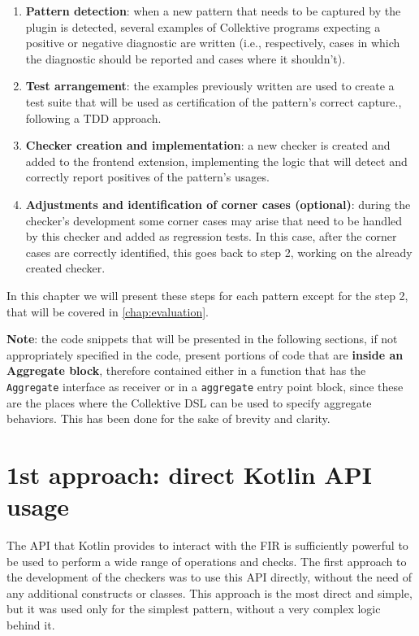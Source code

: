 \documentclass[12pt,a4paper,openright,twoside]{book}
\begin{document}
\begin{enumerate}
  \item \textbf{Pattern detection}: when a new pattern that needs to be captured
  by the plugin is detected, several examples of Collektive programs expecting a
  positive or negative  diagnostic are written (i.e., respectively, cases in
  which the diagnostic should be reported and cases where it shouldn't).
  \item \textbf{Test arrangement}: the examples previously written are used to 
  create a test suite that will be used as certification of the pattern's correct
  capture., following a \ac{TDD} approach.
  \item \textbf{Checker creation and implementation}: a new checker is created and
  added to the frontend extension, implementing the logic that will detect and 
  correctly report positives of the pattern's usages.
  \item \textbf{Adjustments and identification of corner cases (optional)}: during
  the checker's development some corner cases may arise that need to be handled 
  by this checker and added as regression tests. In this case, after the corner 
  cases are correctly identified, this goes back to step 2, working on the already
  created checker.
\end{enumerate}

In this chapter we will present these steps for each pattern except for the step
2, that will be covered in \cref{chap:evaluation}. 

\textbf{Note}: the code snippets that will be presented in the following
sections, if not appropriately specified in the code, present portions of code
that are \textbf{inside an Aggregate block}, therefore contained either in a
function that has the \lstinline{Aggregate} interface as receiver or in a 
\lstinline{aggregate} entry point block, since these are the places where 
the Collektive DSL can be used to specify aggregate behaviors. This has been
done for the sake of brevity and clarity.

\section{1st approach: direct Kotlin API usage}

The API that Kotlin provides to interact with the \ac{FIR} is sufficiently
powerful to be used to perform a wide range of operations and checks. The
first approach to the development of the checkers was to use this API directly,
without the need of any additional constructs or classes. This approach is the
most direct and simple, but it was used only for the simplest pattern, without a
very complex logic behind it.
\end{document}
